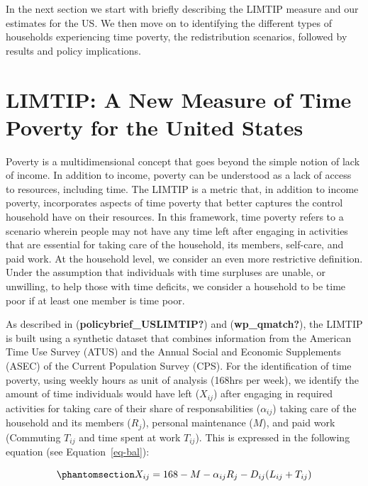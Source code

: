 \documentclass[
  11pt,
]{article}
\begin{document}
In the next section we start with briefly describing the LIMTIP measure
and our estimates for the US. We then move on to identifying the
different types of households experiencing time poverty, the
redistribution scenarios, followed by results and policy implications.

\section{LIMTIP: A New Measure of Time Poverty for the United
States}\label{limtip-a-new-measure-of-time-poverty-for-the-united-states}

Poverty is a multidimensional concept that goes beyond the simple notion
of lack of income. In addition to income, poverty can be understood as a
lack of access to resources, including time. The LIMTIP is a metric
that, in addition to income poverty, incorporates aspects of time
poverty that better captures the control household have on their
resources. In this framework, time poverty refers to a scenario wherein
people may not have any time left after engaging in activities that are
essential for taking care of the household, its members, self-care, and
paid work. At the household level, we consider an even more restrictive
definition. Under the assumption that individuals with time surpluses
are unable, or unwilling, to help those with time deficits, we consider
a household to be time poor if at least one member is time poor.

As described in (\textbf{policybrief\_USLIMTIP?}) and
(\textbf{wp\_qmatch?}), the LIMTIP is built using a synthetic dataset
that combines information from the American Time Use Survey (ATUS) and
the Annual Social and Economic Supplements (ASEC) of the Current
Population Survey (CPS). For the identification of time poverty, using
weekly hours as unit of analysis (168hrs per week), we identify the
amount of time individuals would have left (\(X_{ij}\)) after engaging
in required activities for taking care of their share of
responsabilities (\(\alpha_{ij}\)) taking care of the household and its
members (\(R_j\)), personal maintenance (\(M\)), and paid work
(Commuting \(T_{ij}\) and time spent at work \(T_{ij}\)). This is
expressed in the following equation (see Equation~\ref{eq-bal}):

\begin{equation}\phantomsection\label{eq-bal}{X_{ij} = 168 - M - \alpha_{ij}R_j-D_{ij}(L_{ij}+T_{ij})
}\end{equation}
\end{document}
